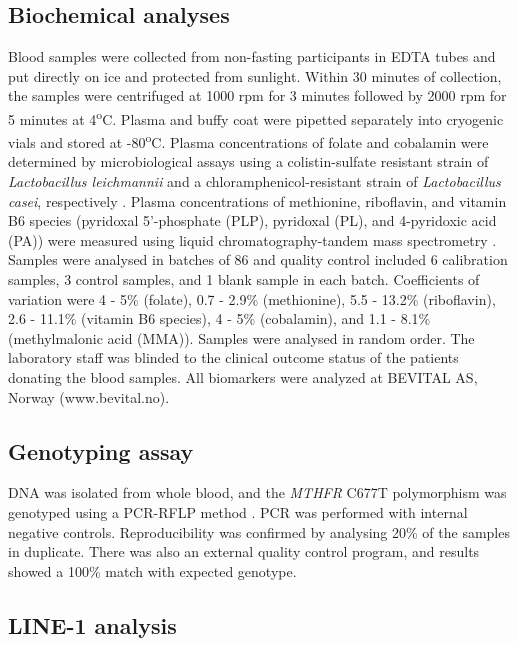 \subsection{Biochemical analyses} %
\noindent Blood samples were collected from non-fasting participants in EDTA tubes and put directly on ice and protected from sunlight. Within 30 minutes of collection, the samples were centrifuged at 1000 rpm for 3 minutes followed by 2000 rpm for 5 minutes at 4\textsuperscript{o}C. Plasma and buffy coat were pipetted separately into cryogenic vials and stored at -80\textsuperscript{o}C. Plasma concentrations of folate and cobalamin were determined by microbiological assays using a colistin-sulfate resistant strain of \emph{Lactobacillus leichmannii} and a chloramphenicol-resistant strain of \emph{Lactobacillus casei}, respectively \cite{c545,c546}. Plasma concentrations of methionine, riboflavin, and vitamin B6 species (pyridoxal 5'-phosphate (PLP), pyridoxal (PL), and 4-pyridoxic acid (PA)) were measured using liquid chromatography-tandem mass spectrometry \cite{c547,c548}. Samples were analysed in batches of 86 and quality control included 6 calibration samples, 3 control samples, and 1 blank sample in each batch. Coefficients of variation were 4 - 5\% (folate), 0.7 - 2.9\% (methionine), 5.5 - 13.2\% (riboflavin), 2.6 - 11.1\% (vitamin B6 species), 4 - 5\% (cobalamin), and 1.1 - 8.1\% (methylmalonic acid (MMA)). Samples were analysed in random order. The laboratory staff was blinded to the clinical outcome status of the patients donating the blood samples. All biomarkers were analyzed at BEVITAL AS, Norway (www.bevital.no).

\subsection{Genotyping assay} %
\noindent DNA was isolated from whole blood, and the \emph{MTHFR} C677T polymorphism was genotyped using a PCR-RFLP method \cite{c549}. PCR was performed with internal negative controls. Reproducibility was confirmed by analysing 20\% of the samples in duplicate. There was also an external quality control program, and results showed a 100\% match with expected genotype. 

\subsection{LINE-1 analysis} %
